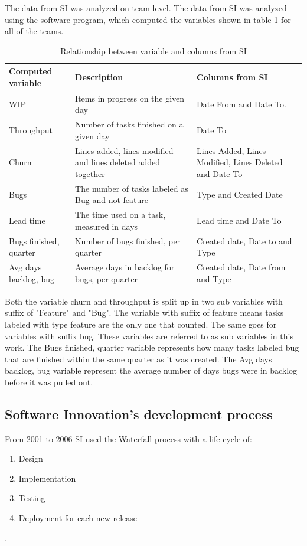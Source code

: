 \documentclass[UKenglish]{ifimaster}  %
\begin{document}
The data from SI was analyzed on team level. The data from SI was analyzed using the software program, which computed the variables shown in table \ref{des} for all of the teams.
\newpage
\begin{table}[htbp]
\begin{center}
    \begin{tabular}{| l | p{5cm} |  p{5cm} |}
    \hline
    \bf{Computed variable} &	\bf{Description}	 & \bf{Columns from SI}\\ \hline 
     WIP & \parbox[t]{5cm}{Items in progress on the given day} & Date From and Date To. \\ \hline
     Throughput	& Number of tasks finished on a given day & Date To \\ \hline
     Churn & Lines added, lines modified and lines deleted added together & Lines Added, Lines Modified, Lines Deleted and Date To \\ \hline
    Bugs & The number of tasks labeled as Bug and not feature & Type and Created Date \\ \hline
    Lead time & The time used on a task, measured in days & Lead time and Date To \\ \hline
    Bugs finished, quarter & Number of bugs finished, per quarter &Created date, Date to and Type \\ \hline
    Avg days backlog, bug & Average days in backlog for bugs, per quarter & Created date, Date from and Type \\ \hline
  \end{tabular}
\caption{Relationship between variable and columns from SI}
\label{des} %
\end{center}
\end{table}

 
Both the variable churn and throughput is split up in two sub variables with suffix of "Feature" and "Bug". The variable with suffix of {feature} means tasks labeled with type {feature} are the only one that counted. The same goes for variables with suffix {bug}. These variables are referred to as sub variables in this work.  The {Bugs finished, quarter} variable represents how many tasks labeled bug that are finished within the same quarter as it was created.  The {Avg days backlog, bug} variable represent the average number of days bugs were in backlog before it was pulled out. %




\subsection{Software Innovation's development process}
From 2001 to 2006 SI used the Waterfall process with a life cycle of:
\begin{enumerate}[noitemsep,topsep=0pt,parsep=0pt,partopsep=0pt]
\item Design
\item Implementation 
\item Testing
\item Deployment for each new release
\end{enumerate} 
\parencite{Dag}. 
\end{document}
